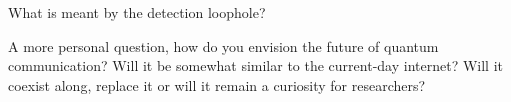 \documentclass{alex_summary}
\begin{document}
\begin{question1}
	What is meant by the detection loophole?
\end{question1}

\begin{question3}
	A more personal question, how do you envision the future of quantum communication? Will it be somewhat similar to the current-day internet? Will it coexist along, replace it or will it remain a curiosity for researchers?
\end{question3}

\printbibliography
\end{document}
